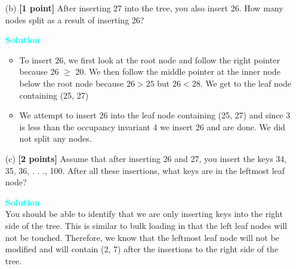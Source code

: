 \documentclass[10pt]{article}
\newenvironment{solution}
    { \begin{mdframed}[backgroundcolor=gray!10] \textcolor{cyan}{\textbf{Solution}} \\}
    {  \end{mdframed}}
\begin{document}
\begin{enumerate}
\begin{itemize}
		      \item[(b)] \textbf{[1 point]} After inserting 27 into the tree, you also insert 26. How many nodes split as a result of inserting
		            26?
		            \begin{solution}
			            \begin{itemize}
				            \item To insert 26, we first look at the root node and follow the right pointer because 26 $\geq$ 20. We
				                  then follow the middle pointer at the inner node below the root node because $26 > 25$ but
				                  $26 < 28$. We get to the leaf node containing (25, 27)
				            \item We attempt to insert 26 into the leaf node containing (25, 27) and since 3 is less than the
				                  occupancy invariant 4 we insert 26 and are done. We did not split any nodes.
			            \end{itemize}
		            \end{solution}

		      \item[(c)] \textbf{[2 points]} Assume that after inserting 26 and 27, you insert the keys 34, 35, 36, . . ., 100. After all these
		            insertions, what keys are in the leftmost leaf node?
		            \begin{solution}
			            You should be able to identify that we are only inserting keys into the right side of the
			            tree. This is similar to bulk loading in that the left leaf nodes will not be touched. Therefore, we
			            know that the leftmost leaf node will not be modified and will contain (2, 7) after the insertions to
			            the right side of the tree.
		            \end{solution}
	      \end{itemize}
\end{enumerate}




\newpage
\end{document}
